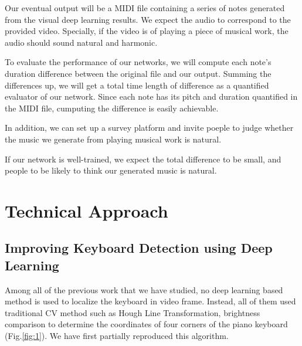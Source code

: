 \documentclass[10pt,twocolumn,letterpaper]{article}
\begin{document}
Our eventual output will be a MIDI file containing a series of notes generated from the visual deep learning results. We expect the audio to correspond to the provided video. Specially, if the video is of playing a piece of musical work, the audio should sound natural and harmonic.

To evaluate the performance of our networks, we will compute each note's duration difference between the original file and our output. Summing the differences up, we will get a total time length of difference as a quantified evaluator of our network. Since each note has its pitch and duration quantified in the MIDI file, cumputing the difference is easily achievable.

In addition, we can set up a survey platform and invite poeple to judge whether the music we generate from playing musical work is natural.

If our network is well-trained, we expect the total difference to be small, and people to be likely to think our generated music is natural.

\section{Technical Approach}

\subsection{Improving Keyboard Detection using Deep Learning}

Among all of the previous work that we have studied, no deep learning based method is used to localize the keyboard in video frame. Instead, all of them used traditional CV method such as Hough Line Transformation, brightness comparison to determine the coordinates of four corners of the piano keyboard (Fig.\ref{fig:1}). We have first partially reproduced this algorithm.
\end{document}
